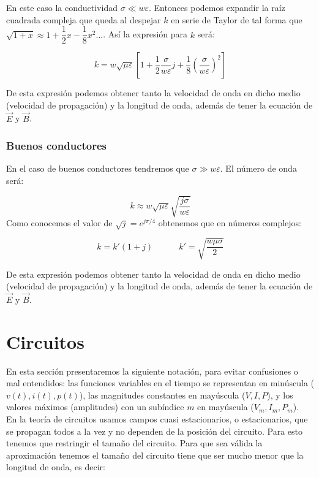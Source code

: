 \documentclass[12pt,a4paper]{article}
\newcommand{\tquad}{\quad \quad \quad}
\begin{document}
En este caso la conductividad $\sigma \ll w \varepsilon$. Entonces podemos expandir la raíz cuadrada compleja que queda al despejar $k$ en serie de Taylor de tal forma que $\sqrt{1+x} \approx 1+ \dfrac{1}{2} x - \dfrac{1}{8} x^2...$. Así la expresión para $k$ será:

\begin{equation}
k = w \sqrt{\mu \varepsilon} \left[ 1 + \dfrac{1}{2} \dfrac{\sigma}{w \varepsilon} j + \dfrac{1}{8} (\dfrac{\sigma}{w \varepsilon})^2 \right]
\end{equation}

De esta expresión podemos obtener tanto la velocidad de onda en dicho medio (velocidad de propagación) y la longitud de onda, además de tener la ecuación de $\vec{E}$ y $\vec{B}$.

\subsubsection{Buenos conductores}

En el caso de buenos conductores tendremos que $\sigma \gg w \varepsilon$. El número de onda será:

\begin{equation}
k \approx w \sqrt{\mu \varepsilon} \sqrt{\dfrac{j \sigma}{w \varepsilon}}
\end{equation}
Como conocemos el valor de $\sqrt{j} = e^{j \pi/4}$ obtenemos que en números complejos:

\begin{equation}
k = k' (1+j) \tquad k' = \sqrt{ \dfrac{w \mu \sigma }{2}}
\end{equation}

De esta expresión podemos obtener tanto la velocidad de onda en dicho medio (velocidad de propagación) y la longitud de onda, además de tener la ecuación de $\vec{E}$ y $\vec{B}$.
\newpage

\section{Circuitos}

En esta sección presentaremos la siguiente notación, para evitar confusiones o mal entendidos: las funciones variables en el tiempo se representan en minúscula ($v(t), i(t),p(t)$), las magnitudes constantes en mayúscula ($V,I,P$), y los valores máximos (amplitudes) con un subíndice $m$ en mayúscula ($V_m,I_m,P_m$). \\

En la teoría de circuitos usamos campos cuasi estacionarios, o estacionarios, que se propagan todos a la vez y no dependen de la posición del circuito. Para esto tenemos que restringir el tamaño del circuito. Para que sea válida la aproximación tenemos el tamaño del circuito tiene que ser mucho menor que la longitud de onda, es decir:
\end{document}
